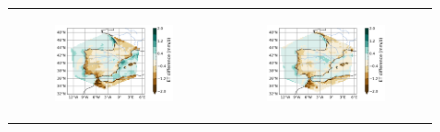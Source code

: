 \begin{figure}[htbp]
\begin{tabular}{cc}
        \begin{subfigure}[b]{0.33\textwidth}
            \caption{}
            \includegraphics[width=\textwidth]{images/chap4/forcing_source/diff_map_evap_era_era.png}
        \end{subfigure} &
        \begin{subfigure}[b]{0.33\textwidth}
            \caption{}
            \includegraphics[width=\textwidth]{images/chap4/forcing_source/diff_map_evap_ico_era.png}
        \end{subfigure} \\
        

\end{tabular}
\end{figure}
